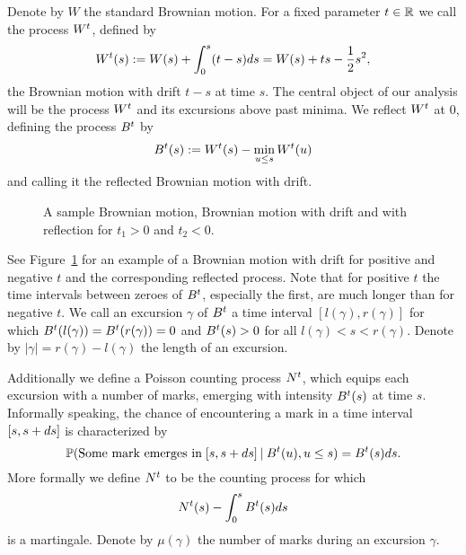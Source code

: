 Denote by $W$ the standard Brownian motion. 
For a fixed parameter $t \in \mathbb{R}$ we call the process $W^t$, defined by
\begin{equation}
	W^t(s) := W(s) + \int_{0}^{s}(t-s)ds = W(s) + ts - \frac{1}{2}s^2,
\end{equation}
the Brownian motion with drift $t-s$ at time $s$.
The central object of our analysis will be the process $W^t$ and its excursions above past minima.
We reflect $W^t$ at $0$, defining the process $B^t$ by
\begin{equation}
	B^t(s) := W^t(s) - \min_{u \leq s}W^t(u)
\end{equation}
and calling it the reflected Brownian motion with drift.

\begin{figure}%
	\centering
	\subfloat[$W(s)$]{}%
	\quad
	\subfloat[$W^{t_1}(s)$]{}%
	\quad
	\subfloat[$B^{t_1}(s)$]{}%
	\quad
	\subfloat[$W^{t_2}(s)$]{}%
	\quad
	\subfloat[$B^{t_2}(s)$]{}%
	\caption{A sample Brownian motion, Brownian motion with drift and with reflection for $t_1>0$ and $t_2<0$.}%
	\label{F: BM}%
\end{figure}

See Figure~\ref{F: BM} for an example of a Brownian motion with drift for positive and negative $t$ and the corresponding reflected process.
Note that for positive $t$ the time intervals between zeroes of $B^t$, especially the first, are much longer than for negative $t$.
We call an excursion $\gamma$ of $B^t$ a time interval $[l(\gamma), r(\gamma)]$ for which $B^t(l(\gamma)) = B^t(r(\gamma)) = 0$
and $B^t(s) > 0$ for all $l(\gamma) < s < r(\gamma)$.
Denote by $|\gamma| = r(\gamma) - l(\gamma)$ the length of an excursion.

Additionally we define a Poisson counting process $N^t$, 
which equips each excursion with a number of marks,
emerging with intensity $B^t(s)$ at time $s$.
Informally speaking, the chance of encountering a mark in a time interval $[s, s+ds]$ is characterized by
\begin{equation}
	\mathbb{P}( \text{Some mark emerges in} \; [s, s+ds] \: | \: B^t(u), u \leq s ) = B^t(s)ds.
\end{equation}
More formally we define $N^t$ to be the counting process for which
\begin{equation}
	N^t(s) - \int_{0}^{s} B^t(s)ds
\end{equation}
is a martingale.
Denote by $\mu(\gamma)$ the number of marks during an excursion $\gamma$.

